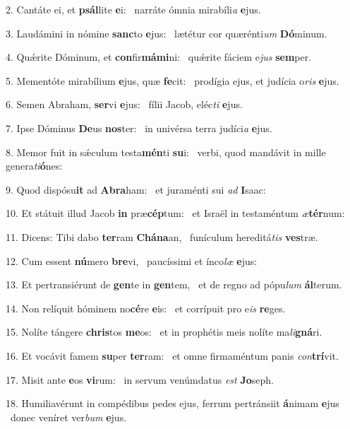 2. Cantáte ei, et \textbf{psál}lite \textbf{e}i: \ast\  narráte ómnia mirabíli\textit{a} \textbf{e}jus.\

3. Laudámini in nómine \textbf{sanc}to \textbf{e}jus: \ast\  lætétur cor quærénti\textit{um} \textbf{Dó}minum.\

4. Quǽrite Dóminum, et \textbf{con}fir\textbf{má}\textbf{mi}ni: \ast\  quǽrite fáciem e\textit{jus} \textbf{sem}per.\

5. Mementóte mirabílium \textbf{e}jus, quæ \textbf{fe}cit: \ast\  prodígia ejus, et judícia o\textit{ris} \textbf{e}jus.\

6. Semen Abraham, \textbf{ser}vi \textbf{e}jus: \ast\  fílii Jacob, eléc\textit{ti} \textbf{e}jus.\

7. Ipse Dóminus \textbf{De}us \textbf{nos}ter: \ast\  in univérsa terra judíci\textit{a} \textbf{e}jus.\

8. Memor fuit in sǽculum testa\textbf{mén}ti \textbf{su}i: \ast\  verbi, quod mandávit in mille genera\textit{ti}\textbf{ó}nes:\

9. Quod dispósu\textbf{it} ad \textbf{A}\textbf{bra}ham: \ast\  et juraménti sui \textit{ad} \textbf{I}saac:\

10. Et státuit illud Jacob \textbf{in} præ\textbf{cép}tum: \ast\  et Israël in testaméntum \textit{æ}\textbf{tér}num:\

11. Dicens: Tibi dabo \textbf{ter}ram \textbf{Chá}\textbf{na}an, \ast\  funículum hereditá\textit{tis} \textbf{ves}træ.\

12. Cum essent \textbf{nú}mero \textbf{bre}vi, \ast\  paucíssimi et ínco\textit{læ} \textbf{e}jus:\

13. Et pertransiérunt de \textbf{gen}te in \textbf{gen}tem, \ast\  et de regno ad pópu\textit{lum} \textbf{ál}terum.\

14. Non relíquit hóminem no\textbf{cé}re \textbf{e}is: \ast\  et corrípuit pro e\textit{is} \textbf{re}ges.\

15. Nolíte tángere \textbf{chris}tos \textbf{me}os: \ast\  et in prophétis meis nolíte ma\textit{li}\textbf{gná}ri.\

16. Et vocávit famem \textbf{su}per \textbf{ter}ram: \ast\  et omne firmaméntum panis \textit{con}\textbf{trí}vit.\

17. Misit ante \textbf{e}os \textbf{vi}rum: \ast\  in servum venúmdatus \textit{est} \textbf{Jo}seph.\

18. Humiliavérunt in compédibus pedes ejus, ferrum pertránsiit \textbf{á}nimam \textbf{e}jus \ast\  donec veníret ver\textit{bum} \textbf{e}jus.\

